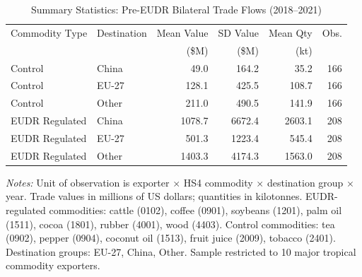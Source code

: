 \begin{table}[htbp]
\centering
\caption{Summary Statistics: Pre-EUDR Bilateral Trade Flows (2018--2021)}
\label{tab:summary}
\small
\begin{tabular}{llrrrr}
\hline\hline
Commodity Type & Destination & Mean Value & SD Value & Mean Qty & Obs. \\
 & & (\$M) & (\$M) & (kt) & \\
\hline
Control & China & 49.0 & 164.2 & 35.2 & 166 \\
Control & EU-27 & 128.1 & 425.5 & 108.7 & 166 \\
Control & Other & 211.0 & 490.5 & 141.9 & 166 \\
EUDR Regulated & China & 1078.7 & 6672.4 & 2603.1 & 208 \\
EUDR Regulated & EU-27 & 501.3 & 1223.4 & 545.4 & 208 \\
EUDR Regulated & Other & 1403.3 & 4174.3 & 1563.0 & 208 \\
\hline\hline
\end{tabular}
\begin{minipage}{0.95\textwidth}
\vspace{0.3em}\footnotesize
\textit{Notes:} Unit of observation is exporter $\times$ HS4 commodity $\times$ destination group $\times$ year. Trade values in millions of US dollars; quantities in kilotonnes. EUDR-regulated commodities: cattle (0102), coffee (0901), soybeans (1201), palm oil (1511), cocoa (1801), rubber (4001), wood (4403). Control commodities: tea (0902), pepper (0904), coconut oil (1513), fruit juice (2009), tobacco (2401). Destination groups: EU-27, China, Other. Sample restricted to 10 major tropical commodity exporters.
\end{minipage}
\end{table}
